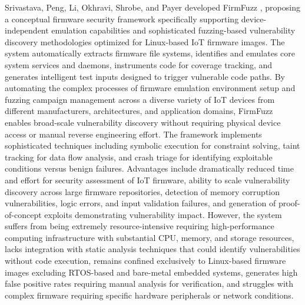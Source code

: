 Srivastava, Peng, Li, Okhravi, Shrobe, and Payer developed FirmFuzz \cite{srivastava2019firmfuzz}, proposing a conceptual firmware security framework specifically supporting device-independent emulation capabilities and sophisticated fuzzing-based vulnerability discovery methodologies optimized for Linux-based IoT firmware images. The system automatically extracts firmware file systems, identifies and emulates core system services and daemons, instruments code for coverage tracking, and generates intelligent test inputs designed to trigger vulnerable code paths. By automating the complex processes of firmware emulation environment setup and fuzzing campaign management across a diverse variety of IoT devices from different manufacturers, architectures, and application domains, FirmFuzz enables broad-scale vulnerability discovery without requiring physical device access or manual reverse engineering effort. The framework implements sophisticated techniques including symbolic execution for constraint solving, taint tracking for data flow analysis, and crash triage for identifying exploitable conditions versus benign failures. Advantages include dramatically reduced time and effort for security assessment of IoT firmware, ability to scale vulnerability discovery across large firmware repositories, detection of memory corruption vulnerabilities, logic errors, and input validation failures, and generation of proof-of-concept exploits demonstrating vulnerability impact. However, the system suffers from being extremely resource-intensive requiring high-performance computing infrastructure with substantial CPU, memory, and storage resources, lacks integration with static analysis techniques that could identify vulnerabilities without code execution, remains confined exclusively to Linux-based firmware images excluding RTOS-based and bare-metal embedded systems, generates high false positive rates requiring manual analysis for verification, and struggles with complex firmware requiring specific hardware peripherals or network conditions.

